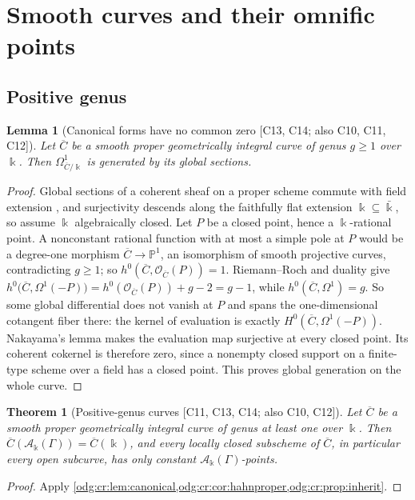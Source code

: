 \documentclass[11pt,oneside]{article}
\numberwithin{equation}{section}
\newtheorem{theorem}{Theorem}[section]
\newtheorem{lemma}[lemma]{Lemma}
\theoremstyle{definition}
\theoremstyle{remark}
\newcommand{\src}[1]{\textup{\textsf{\small[#1]}}}
\newcommand{\crA}{\mathcal A_\Bbbk(\Gamma)}
\begin{document}
\section{Smooth curves and their omnific points}\label{odg:cr:sec:curves}

\subsection{Positive genus}\label{odg:cr:sub:positivegenus}

\begin{lemma}[Canonical forms have no common zero \src{C13, C14; also C10, C11, C12}]\label{odg:cr:lem:canonical}
Let $\overline C$ be a smooth proper geometrically integral curve of genus $g\ge1$
over $\Bbbk$. Then $\Omega^1_{\overline C/\Bbbk}$ is generated by its global sections.
\end{lemma}
\begin{proof}
Global sections of a coherent sheaf on a proper scheme commute with field
extension \cite{StacksBaseChange}, and surjectivity descends along the faithfully
flat extension $\Bbbk\subseteq\bar\Bbbk$, so assume $\Bbbk$ algebraically closed.
Let $P$ be a closed point, hence a $\Bbbk$-rational point.
A nonconstant rational function with at most a simple pole at $P$ would be a
degree-one morphism $\overline C\to\mathbb P^1$, an isomorphism of smooth projective
curves, contradicting $g\ge1$; so $h^0(\overline C,\mathcal O_{\overline C}(P))=1$.
Riemann--Roch and duality \cite{StacksRR} give
$h^0\bigl(\overline C,\Omega^1(-P)\bigr)=h^0(\mathcal O_{\overline C}(P))+g-2=g-1$,
while $h^0(\overline C,\Omega^1)=g$. So some global differential does not vanish at
$P$ and spans the one-dimensional cotangent fiber there: the kernel of evaluation
is exactly $H^0(\overline C,\Omega^1(-P))$. Nakayama's lemma makes the evaluation
map surjective at every closed point. Its coherent cokernel is therefore zero,
since a nonempty closed support on a finite-type scheme over a field has a closed
point. This proves global generation on the whole curve.
\end{proof}

\begin{theorem}[Positive-genus curves \src{C11, C13, C14; also C10, C12}]\label{odg:cr:thm:positivegenus}
Let $\overline C$ be a smooth proper geometrically integral curve of genus at least
one over $\Bbbk$. Then $\overline C(\crA)=\overline C(\Bbbk)$, and every locally closed
subscheme of $\overline C$, in particular every open subcurve, has only constant
$\crA$-points.
\end{theorem}
\begin{proof}
Apply \cref{odg:cr:lem:canonical,odg:cr:cor:hahnproper,odg:cr:prop:inherit}.
\end{proof}
\end{document}
